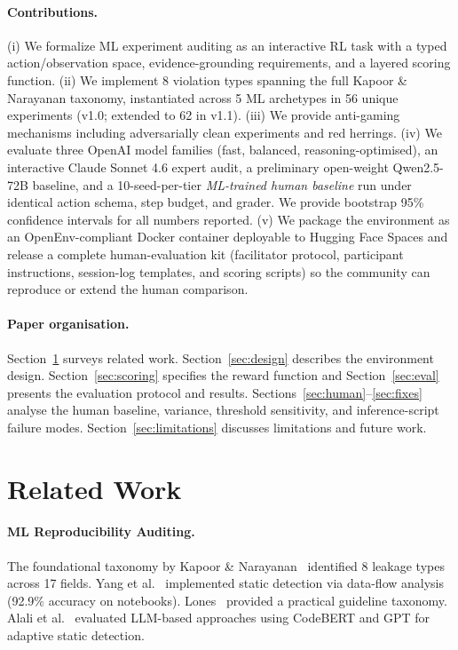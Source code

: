 \documentclass{article}
\begin{document}
\paragraph{Contributions.}
(i) We formalize ML experiment auditing as an interactive RL task with a
typed action/observation space, evidence-grounding requirements, and a
layered scoring function.
(ii) We implement 8 violation types spanning the full Kapoor \& Narayanan
taxonomy, instantiated across 5 ML archetypes in 56 unique experiments
(v1.0; extended to 62 in v1.1).
(iii) We provide anti-gaming mechanisms including adversarially clean
experiments and red herrings.
(iv) We evaluate three OpenAI model families (fast, balanced,
reasoning-optimised), an interactive Claude Sonnet 4.6 expert audit, a
preliminary open-weight Qwen2.5-72B baseline, and a 10-seed-per-tier
\emph{ML-trained human baseline} run under identical action schema, step
budget, and grader.  We provide bootstrap 95\% confidence intervals for
all numbers reported.
(v) We package the environment as an OpenEnv-compliant Docker container
deployable to Hugging Face Spaces and release a complete human-evaluation
kit (facilitator protocol, participant instructions, session-log
templates, and scoring scripts) so the community can reproduce or extend
the human comparison.

\paragraph{Paper organisation.}
Section~\ref{sec:related} surveys related work.
Section~\ref{sec:design} describes the environment design.
Section~\ref{sec:scoring} specifies the reward function and
Section~\ref{sec:eval} presents the evaluation protocol and results.
Sections~\ref{sec:human}--\ref{sec:fixes} analyse the human baseline,
variance, threshold sensitivity, and inference-script failure modes.
Section~\ref{sec:limitations} discusses limitations and future work.

\section{Related Work}
\label{sec:related}

\paragraph{ML Reproducibility Auditing.}
The foundational taxonomy by Kapoor \& Narayanan~\cite{kapoor2023leakage}
identified 8 leakage types across 17 fields.  Yang et al.~\cite{yang2022data}
implemented static detection via data-flow analysis (92.9\% accuracy on
notebooks).  Lones~\cite{lones2021avoid} provided a practical guideline
taxonomy.  Alali et al.~\cite{alali2025llmleakage} evaluated LLM-based
approaches using CodeBERT and GPT for adaptive static detection.
\end{document}

